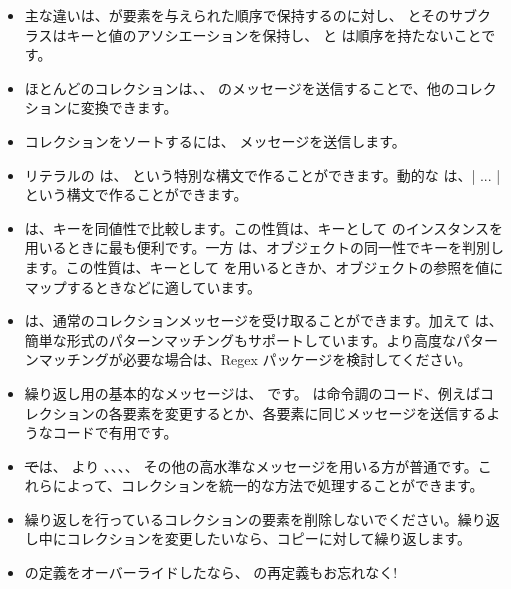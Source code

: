 \documentclass[a4paper,10pt,twoside]{book}
\begin{document}
\begin{itemize}
  \item 主な違いは、が要素を与えられた順序で保持するのに対し、 とそのサブクラスはキーと値のアソシエーションを保持し、 と は順序を持たないことです。
  \item ほとんどのコレクションは、、 \etc のメッセージを送信することで、他のコレクションに変換できます。
  \item コレクションをソートするには、 メッセージを送信します。
  \item リテラルの  は、 という特別な構文で作ることができます。動的な  は、\ct|{ ... }| という構文で作ることができます。
  \item {} は、キーを同値性で比較します。この性質は、キーとして  のインスタンスを用いるときに最も便利です。一方 は、オブジェクトの同一性でキーを判別します。この性質は、キーとして  を用いるときか、オブジェクトの参照を値にマップするときなどに適しています。%
  \item {} は、通常のコレクションメッセージを受け取ることができます。加えて は、簡単な形式のパターンマッチングもサポートしています。より高度なパターンマッチングが必要な場合は、Regex パッケージを検討してください。
  \item 繰り返し用の基本的なメッセージは、 です。 は命令調のコード、例えばコレクションの各要素を変更するとか、各要素に同じメッセージを送信するようなコードで有用です。
  \item \st では、 より 、、、、 その他の高水準なメッセージを用いる方が普通です。これらによって、コレクションを統一的な方法で処理することができます。
  \item 繰り返しを行っているコレクションの要素を削除しないでください。繰り返し中にコレクションを変更したいなら、コピーに対して繰り返します。
  \item \ct{=} の定義をオーバーライドしたなら、 の再定義もお忘れなく!
\end{itemize}

\ifx\wholebook\relax\else
   
   
\end{document}

